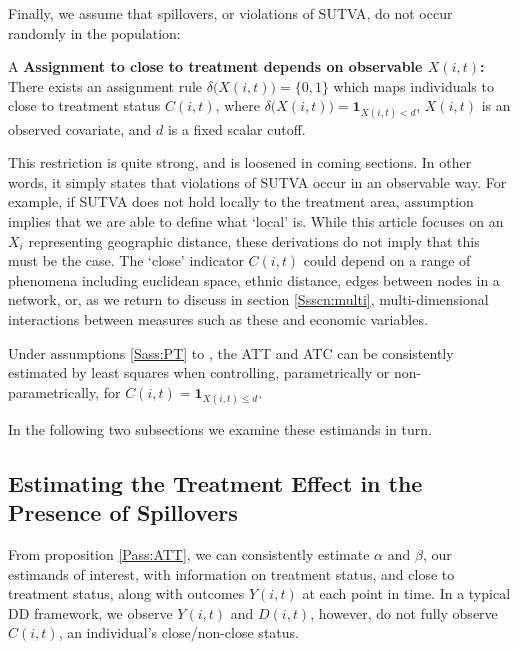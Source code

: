 Finally, we assume that spillovers, or violations of SUTVA, do not occur randomly
in the population:
\begin{assumption}{4}{A}
\label{Sass:SUTVAl}
\textbf{Assignment to close to treatment depends on observable $X(i,t)$:} \\ 
There exists an assignment rule $\delta\Big(X(i,t)\Big)=\{0,1\}$ which maps 
individuals to close to treatment status $C(i,t)$, where $\delta\Big(X(i,t)\Big)=
\mathbf{1}_{X(i,t)<d}$, $X(i,t)$ is an observed covariate, and $d$ is a fixed
scalar cutoff. 
\end{assumption}
\vspace{-4mm}
\noindent This restriction is quite strong, and is loosened in coming sections.  
In other words, it simply states 
that violations of SUTVA occur in an observable way.  For example, if SUTVA does
not hold locally to the treatment area, assumption  implies
that we are able to define what `local' is.  While this article focuses on
an $X_i$ representing geographic distance, these derivations do not imply that 
this must be the case.  The `close' indicator $C(i,t)$ could depend on a range 
of phenomena including euclidean space, ethnic distance, edges between
nodes in a network, or, as we return to discuss in section
\ref{Ssscn:multi}, multi-dimensional interactions between measures such as these 
and economic variables. 
\begin{proposition}
\label{Pass:ATT}
Under assumptions \ref{Sass:PT} to , the ATT and ATC can be 
consistently estimated by least squares when controlling, parametrically or
non-parametrically, for $C(i,t)=\mathbf{1}_{X(i,t)\leq d}$.
\end{proposition}
\noindent In the following two subsections we examine these estimands in turn. 

\subsection{Estimating the Treatment Effect in the Presence of Spillovers}
\label{Ssscn:TE}
From proposition \ref{Pass:ATT}, we can consistently estimate $\alpha$ and 
$\beta$, our estimands of interest, with information on treatment status, and 
close to treatment status, along with outcomes $Y(i,t)$ at each point in time. In 
a typical DD framework, we observe $Y(i,t)$ and $D(i,t)$, however, do not fully 
observe $C(i,t)$, an individual's close/non-close status.

